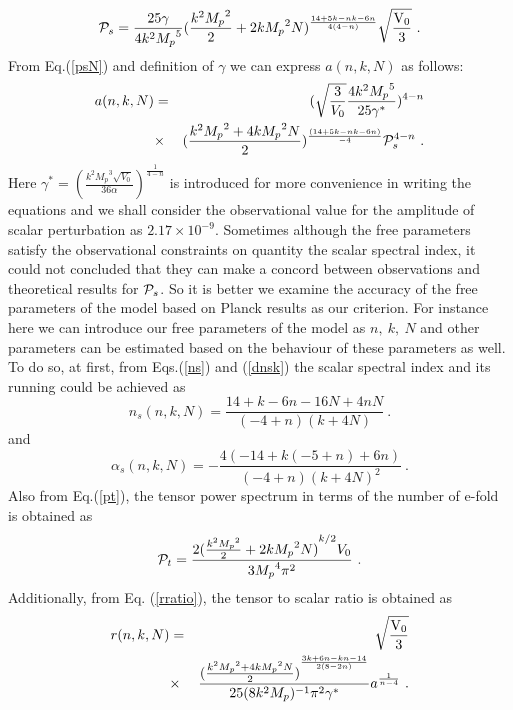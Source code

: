 \documentclass[12pt]{revtex4}
\begin{document}
\begin{equation}
{\cal P}_s = \frac{{25\gamma }}{{4{k^2}{M_p}^5}}{(\frac{{{k^2}{M_p}^2}}{2} + 2k{M_p}^2N)^{\frac{{14 + 5k - nk -6n  }}{{4(4 - n)}}}}\sqrt {\frac{{{{\rm{V}}_0}}}{3}}~.\label{psN}
\end{equation}
From Eq.(\ref{psN}) and definition of $\gamma$ we can express $a(n, k, N)$ as follows:
\begin{eqnarray}
a(n, k, N) &=& ({\sqrt{\frac{{{3}}}{V_0}}}\frac{{4{k^2}{M_p}^5}}{{25\gamma^\ast }})^{{4-n}}\\ \nonumber
&\times&{(\frac{{{k^2}{M_p}^2+ 4k{M_p}^2N}}{2} )^{\frac{{( 14 + 5k - nk -6n) }}{{-4}}}}{\cal P}_s^{4-n}~.\label{a-psN}
\end{eqnarray}
Here $\gamma^\ast={(\frac{{{k^2}{M_p}^3\sqrt {{V_0}} }}{36 \alpha })^{\frac{1}{{4 - n}}}}$ is introduced for more convenience in writing the equations and we shall consider the observational value for the amplitude of scalar perturbation as $2.17\times 10^{-9}$. Sometimes although the free parameters satisfy the observational constraints on  quantity the scalar spectral index, it could not concluded that they can make a concord between observations and theoretical results for ${\cal P}_s$. So it is better we examine the accuracy of the free parameters of the model based on Planck results as our criterion. For instance here we can introduce our free parameters of the model as $n,~k,~ N$ and other parameters can be estimated based on the behaviour of these parameters as well.
To do so, at first, from Eqs.(\ref{ns}) and (\ref{dnsk}) the scalar spectral index and its running could be achieved as
\begin{equation}
n_s(n, k, N)=\frac{{14 + k - 6n - 16N + 4nN}}{{( - 4 + n)(k + 4N)}}~.\label{nsN}
\end{equation}
and
\begin{equation}
\alpha_s(n, k, N)= - \frac{{4( - 14 + k( - 5 + n) + 6n)}}{{( - 4 + n){{(k + 4N)}^2}}}~.\label{dnsN}
\end{equation}
Also from Eq.(\ref{pt}), the tensor power spectrum in terms of the number of e-fold is obtained as
\begin{equation}
{{\cal P}_t}=\frac{{2{{(\frac{{{k^2}{M_p}^2}}{2} + 2k{M_p}^2N)}^{k/2}}{V_0}}}{{3{M_p}^4{\pi ^2}}}~. \label{ptN}
\end{equation}
Additionally, from Eq. (\ref{rratio}), the tensor to scalar ratio is obtained as
\begin{eqnarray}\nonumber
r{\rm{ }}(n, k, N) &=&\sqrt {\frac{{{{\rm{V}}_0}}}{3}}\\
&\times&  \frac{{{{(\frac{{{k^2}{M_p}^2+ 4k{M_p}^2N}}{2})}^{\frac{{3k + 6n - kn - 14}}{{2(8 - 2n)}}}}}}{{25 (8{k^2}{M_p})^{-1}{\pi ^2}\gamma^\ast }} a^{\frac{1}{n-4}} ~.\label{rNweak}
\end{eqnarray}
\end{document}
